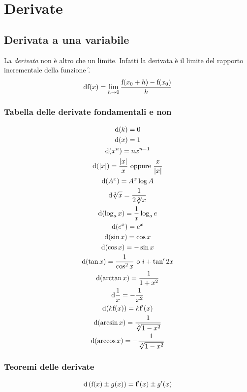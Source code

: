 \section{Derivate}

\subsection{Derivata a una variabile}
	La \textit{derivata} non è altro che un limite. Infatti la derivata è il limite del rapporto incrementale della funzione \f.
\[{\rm d}\text{\text{f}}(x)=\mathop{\lim}\limits_{h \to 0} \frac{\text{\text{f}}(x_0+h)-\text{\text{f}}(x_0)}{h}
\]	
	\subsubsection{Tabella delle derivate fondamentali e non}
	\begin{gather*}
		 {\rm d}(k)=0\\
		 {\rm d}(x)=1\\
		 {\rm d}(x^n)=nx^{n-1}\\
		 {\rm d}(\left|{x}\right| )=\frac{\left|{x}\right|}{x} \text{ oppure }\frac{x}{\left|{x}\right|}\\
		 {\rm d}(A^x)=A^x\log{A}\\
		 {\rm d}\sqrt[2]{x}=\frac{1}{2\sqrt[2]{x}}\\
		 {\rm d}(\log_a{x})=\frac{1}{x}\log_a{e}\\
		 {\rm d}(e^x)=e^x\\
		 {\rm d}(\sin{x})=\cos{x}\\
		 {\rm d}(\cos{x})=- \sin{x}\\
		 {\rm d}(\tan{x})=\frac{1}{\cos^2{x}} \text{ o } i+\tan'2x\\
		 {\rm d}(\arctan{x})=\frac{1}{1+x^2}\\
		 {\rm d}\frac{1}{x}=-\frac{1}{x^2}\\
		 {\rm d}(k\text{\text{f}}(x))=k\text{\text{f}}'(x)\\
		 {\rm d}(\arcsin x)=\frac{1}{\sqrt[2]{1-x^2}}\\
		 {\rm d}(\arccos x)=-\frac{1}{\sqrt[2]{1-x^2}}\\	\end{gather*}
	
		\subsubsection{Teoremi delle derivate}
		
		 \begin{thm}[]
		  \[
		  {\rm d}\left({\text{\text{f}}(x)\pm g(x)}\right)=\text{\text{f}}'(x)\pm g'(x)
		  \]
		  \end{thm}
		  
